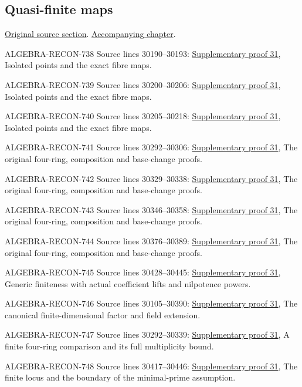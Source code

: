 \subsection{Quasi-finite maps}
\hypertarget{algebra-source-section-quasi-finite}{}
\noindent\href{https://github.com/stacks/stacks-project/blob/a04446e57ec1fbc252a871afcec7752fb2807b14/algebra.tex\#L30093}{Original source section}. \href{algebra.pdf\#nameddest=section-quasi-finite}{Accompanying chapter}.

\begin{AlgebraSourceRoutes}
\item[ALGEBRA-RECON-738] Source lines 30190--30193: \hyperlink{algebra_quasifinite_notes_20260928}{Supplementary proof 31}, Isolated points and the exact fibre maps.
\item[ALGEBRA-RECON-739] Source lines 30200--30206: \hyperlink{algebra_quasifinite_notes_20260928}{Supplementary proof 31}, Isolated points and the exact fibre maps.
\item[ALGEBRA-RECON-740] Source lines 30205--30218: \hyperlink{algebra_quasifinite_notes_20260928}{Supplementary proof 31}, Isolated points and the exact fibre maps.
\item[ALGEBRA-RECON-741] Source lines 30292--30306: \hyperlink{algebra_quasifinite_notes_20260928}{Supplementary proof 31}, The original four-ring, composition and base-change proofs.
\item[ALGEBRA-RECON-742] Source lines 30329--30338: \hyperlink{algebra_quasifinite_notes_20260928}{Supplementary proof 31}, The original four-ring, composition and base-change proofs.
\item[ALGEBRA-RECON-743] Source lines 30346--30358: \hyperlink{algebra_quasifinite_notes_20260928}{Supplementary proof 31}, The original four-ring, composition and base-change proofs.
\item[ALGEBRA-RECON-744] Source lines 30376--30389: \hyperlink{algebra_quasifinite_notes_20260928}{Supplementary proof 31}, The original four-ring, composition and base-change proofs.
\item[ALGEBRA-RECON-745] Source lines 30428--30445: \hyperlink{algebra_quasifinite_notes_20260928}{Supplementary proof 31}, Generic finiteness with actual coefficient lifts and nilpotence powers.
\item[ALGEBRA-RECON-746] Source lines 30105--30390: \hyperlink{algebra_quasifinite_notes_20260928}{Supplementary proof 31}, The canonical finite-dimensional factor and field extension.
\item[ALGEBRA-RECON-747] Source lines 30292--30339: \hyperlink{algebra_quasifinite_notes_20260928}{Supplementary proof 31}, A finite four-ring comparison and its full multiplicity bound.
\item[ALGEBRA-RECON-748] Source lines 30417--30446: \hyperlink{algebra_quasifinite_notes_20260928}{Supplementary proof 31}, The finite locus and the boundary of the minimal-prime assumption.
\end{AlgebraSourceRoutes}

